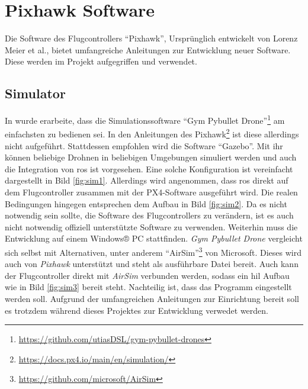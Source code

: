\section{Pixhawk Software}
Die Software des Flugcontrollers \enquote{Pixhawk}, Ursprünglich entwickelt von Lorenz Meier et al., bietet umfangreiche Anleitungen zur Entwicklung neuer Software. Diese werden im Projekt aufgegriffen und verwendet.
\subsection{Simulator}
In \cite[Kapitel 6.5]{wirthErweiterungBestehendenDrohne2022a} wurde erarbeite, dass die Simulationssoftware \enquote{Gym Pybullet Drone}\footnote{\url{https://github.com/utiasDSL/gym-pybullet-drones}\cite{paneratiLearningFlyGym2021}} am einfachsten zu bedienen sei. In den Anleitungen des Pixhawk\footnote{\url{https://docs.px4.io/main/en/simulation/}\cite{dronecodestiftungPX4UserGuide}} ist diese allerdings nicht aufgeführt. Stattdessen empfohlen wird die Software \enquote{Gazebo}. Mit ihr können beliebige Drohnen in beliebigen Umgebungen simuliert werden und auch die Integration von \gls{ros} ist vorgesehen. Eine solche Konfiguration ist vereinfacht dargestellt in Bild \ref{fig:sim1}. Allerdings wird angenommen, dass \gls{ros} direkt auf dem Flugcontroller zusammen mit der PX4-Software ausgeführt wird. Die realen Bedingungen hingegen entsprechen dem Aufbau in Bild \ref{fig:sim2}. Da es nicht notwendig sein sollte, die Software des Flugcontrollers zu verändern, ist es auch nicht notwendig offiziell unterstützte Software zu verwenden. Weiterhin muss die Entwicklung auf einem Windows® PC stattfinden. \textit{Gym Pybullet Drone} vergleicht sich selbst mit Alternativen, unter anderem \enquote{AirSim}\footnote{\url{https://github.com/microsoft/AirSim}\cite{microsoftcorporationWelcomeAirSim2023}} von Microsoft. Dieses wird auch von \textit{Pixhawk} unterstützt und steht als ausführbare Datei bereit. Auch kann der Flugcontroller direkt mit \textit{AirSim} verbunden werden, sodass ein \gls{hil} Aufbau wie in Bild \ref{fig:sim3} bereit steht. Nachteilig ist, dass das Programm eingestellt werden soll. Aufgrund der umfangreichen Anleitungen zur Einrichtung bereit\cite[siehe \enquote*{documentation}]{microsoftcorporationWelcomeAirSim2023} soll es trotzdem während dieses Projektes zur Entwicklung verwedet werden.

